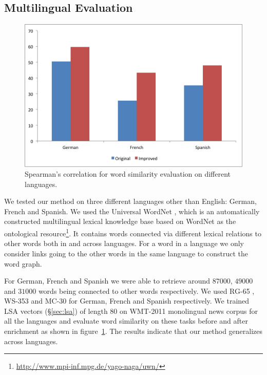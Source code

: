 \documentclass[11pt]{article}
\begin{document}
\subsection{Multilingual Evaluation}
\label{sec:multilingual}

\begin{figure}[!tb]
  \centering
  \includegraphics[width=\columnwidth]{multilingual.png}
  \caption{Spearman's correlation for word similarity evaluation on different languages.}
  \label{fig:multi-lang}
\end{figure}

We tested our method on three different languages other than English: German,
French and Spanish. We used the Universal WordNet \cite{deMeloWeikum2009}, which 
is an automatically constructed multilingual lexical knowledge base based on 
WordNet as the ontological resource\footnote{\url{http://www.mpi-inf.mpg.de/yago-naga/uwn/}}. 
It contains words connected via different lexical relations to other words both
in and across languages. For a word in a language we only consider links going to
the other words in the same language to construct the word graph.

For German, French and Spanish we were able to retrieve around $87000$, $49000$
and $31000$ words being connected to other words respectively. We used 
RG-65 \cite{Gurevych:2005:USC:2145899.2145986}, WS-353 \cite{Joubarne:2011:CSS:2018192.2018218} 
and MC-30 \cite{Hassan:2009:CSR:1699648.1699665} for German, French and Spanish respectively. 
We trained LSA vectors (\S\ref{sec:lsa}) of length $80$ on WMT-2011 monolingual news corpus for all the 
languages and evaluate word similarity on these tasks before and after enrichment as 
shown in figure~\ref{fig:multi-lang}. The results indicate that our method generalizes across languages.
\end{document}
